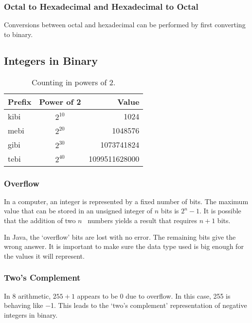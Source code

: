 \subsubsection{Octal to Hexadecimal and Hexadecimal to Octal}

Conversions between octal and hexadecimal can be performed by first converting to binary.

\subsection{Integers in Binary}

\begin{table}[htp]
  \centering
  \caption*{Counting in powers of \num{2}.}
  \begin{tabular}{lcr}
    \toprule
    Prefix & Power of \num{2} & Value\\
    \midrule
    kibi & \( {2}^{10} \) &          1024 \\
    mebi & \( {2}^{20} \) &       1048576 \\
    gibi & \( {2}^{30} \) &    1073741824 \\
    tebi & \( {2}^{40} \) & 1099511628000 \\
    \bottomrule
  \end{tabular}
\end{table}

\subsubsection{Overflow}

In a computer, an integer is represented by a fixed number of bits.
The maximum value that can be stored in an unsigned integer of \( n \) bits is \( 2^n - 1 \).
It is possible that the addition of two \(n\)~\si{\bit} numbers yields a result that requires \( n+ 1 \) bits.

In Java, the `overflow' bits are lost with no error.
The remaining bits give the wrong answer.
It is important to make sure the data type used is big enough for the values it will represent.

\subsubsection{Two's Complement}

In \SI{8}{\bit} arithmetic, \( 255 + 1 \) appears to be \num{0} due to overflow.
In this case, \num{255} is behaving like \num{-1}.
This leads to the `two's complement' representation of negative integers in binary.

